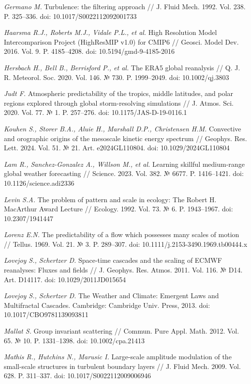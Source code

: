 \documentclass[12pt,a4paper]{article}
\begin{document}
\noindent \textit{Germano M.} Turbulence: the filtering approach // J. Fluid Mech. 1992. Vol. 238. P. 325–336. doi: 10.1017/S0022112092001733

\noindent \textit{Haarsma R.J., Roberts M.J., Vidale P.L., et al.} High Resolution Model Intercomparison Project (HighResMIP v1.0) for CMIP6 // Geosci. Model Dev. 2016. Vol. 9. P. 4185–4208. doi: 10.5194/gmd-9-4185-2016

\noindent \textit{Hersbach H., Bell B., Berrisford P., et al.} The ERA5 global reanalysis // Q. J. R. Meteorol. Soc. 2020. Vol. 146. № 730. P. 1999–2049. doi: 10.1002/qj.3803

\noindent \textit{Judt F.} Atmospheric predictability of the tropics, middle latitudes, and polar regions explored through global storm-resolving simulations // J. Atmos. Sci. 2020. Vol. 77. № 1. P. 257–276. doi: 10.1175/JAS-D-19-0116.1

\noindent \textit{Kouhen S., Storer B.A., Aluie H., Marshall D.P., Christensen H.M.} Convective and orographic origins of the mesoscale kinetic energy spectrum // Geophys. Res. Lett. 2024. Vol. 51. № 21. Art. e2024GL110804. doi: 10.1029/2024GL110804

\noindent \textit{Lam R., Sanchez-Gonzalez A., Willson M., et al.} Learning skillful medium-range global weather forecasting // Science. 2023. Vol. 382. № 6677. P. 1416–1421. doi: 10.1126/science.adi2336

\noindent \textit{Levin S.A.} The problem of pattern and scale in ecology: The Robert H. MacArthur Award Lecture // Ecology. 1992. Vol. 73. № 6. P. 1943–1967. doi: 10.2307/1941447

\noindent \textit{Lorenz E.N.} The predictability of a flow which possesses many scales of motion // Tellus. 1969. Vol. 21. № 3. P. 289–307. doi: 10.1111/j.2153-3490.1969.tb00444.x

\noindent \textit{Lovejoy S., Schertzer D.} Space-time cascades and the scaling of ECMWF reanalyses: Fluxes and fields // J. Geophys. Res. Atmos. 2011. Vol. 116. № D14. Art. D14117. doi: 10.1029/2011JD015654

\noindent \textit{Lovejoy S., Schertzer D.} The Weather and Climate: Emergent Laws and Multifractal Cascades. Cambridge: Cambridge Univ. Press, 2013. doi: 10.1017/CBO9781139093811

\noindent \textit{Mallat S.} Group invariant scattering // Commun. Pure Appl. Math. 2012. Vol. 65. № 10. P. 1331–1398. doi: 10.1002/cpa.21413

\noindent \textit{Mathis R., Hutchins N., Marusic I.} Large-scale amplitude modulation of the small-scale structures in turbulent boundary layers // J. Fluid Mech. 2009. Vol. 628. P. 311–337. doi: 10.1017/S0022112009006946
\end{document}
